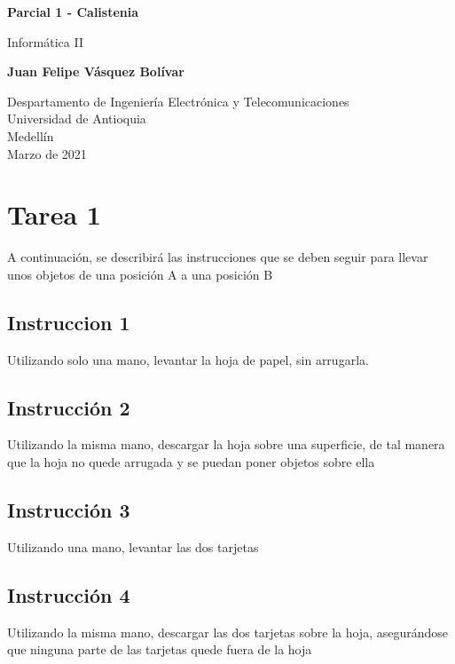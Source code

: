 \documentclass{article}
\begin{document}
\begin{titlepage}
    \begin{center}
        \vspace*{1cm}
            
        \Huge
        \textbf{Parcial 1 - Calistenia}
            
        \vspace{0.5cm}
        \LARGE
        Informática II
            
        \vspace{1.5cm}
            
        \textbf{Juan Felipe Vásquez Bolívar}
            
        \vfill
            
        \vspace{0.8cm}
            
        \Large
        Despartamento de Ingeniería Electrónica y Telecomunicaciones\\
        Universidad de Antioquia\\
        Medellín\\
        Marzo de 2021
            
    \end{center}
\end{titlepage}


\newpage
\section{Tarea 1 }\label{intro}
A continuación, se describirá las instrucciones que se deben seguir para llevar unos objetos de una posición A a una posición B
\subsection{Instruccion 1}
Utilizando solo una mano, levantar la hoja de papel, sin arrugarla.
\subsection{Instrucción 2}
Utilizando la misma mano, descargar la hoja sobre una superficie, de tal manera que la hoja no quede arrugada y se puedan poner objetos sobre ella
\subsection{Instrucción 3}
Utilizando una mano, levantar las dos tarjetas
\subsection{Instrucción 4}
Utilizando la misma mano, descargar las dos tarjetas sobre la hoja, asegurándose que ninguna parte de las tarjetas quede fuera de la hoja
\end{document}
